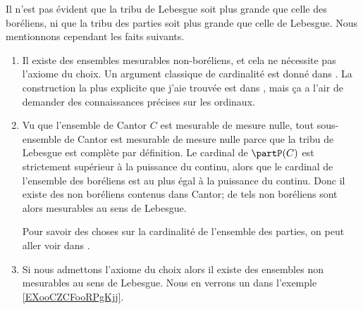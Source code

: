 \begin{remark}
    Il n'est pas évident que la tribu de Lebesgue soit plus grande que celle des boréliens, ni que la tribu des parties soit plus grande que celle de Lebesgue. Nous mentionnons cependant les faits suivants.
    \begin{enumerate}
        \item
            Il existe des ensembles mesurables non-boréliens, et cela ne nécessite pas l'axiome du choix. Un argument classique de cardinalité est donné dans \cite{SFYoobgQUp}. La construction la plus explicite que j'aie trouvée est dans \cite{XSHoosgoQa}, mais ça a l'air de demander des connaissances précises sur les ordinaux.
        \item
            Vu que l'ensemble de Cantor \( C\) est mesurable de mesure nulle, tout sous-ensemble de Cantor est mesurable de mesure nulle parce que la tribu de Lebesgue est complète par définition. Le cardinal de \( \partP(C)\) est strictement supérieur à la puissance du continu, alors que le cardinal de l'ensemble des boréliens est au plus égal à la puissance du continu. Donc il existe des non boréliens contenus dans Cantor; de tels non boréliens sont alors mesurables au sens de Lebesgue.

            Pour savoir des choses sur la cardinalité de l'ensemble des parties, on peut aller voir dans \cite{KZIoofzFLV}.
        \item
            Si nous admettons l'axiome du choix alors il existe des ensembles non mesurables au sens de Lebesgue. Nous en verrons un dans l'exemple \ref{EXooCZCFooRPgKjj}.
    \end{enumerate}
\end{remark}

